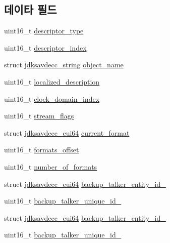 \subsection*{데이타 필드}
\begin{DoxyCompactItemize}
\item 
uint16\+\_\+t \hyperlink{structjdksavdecc__descriptor__stream_ab7c32b6c7131c13d4ea3b7ee2f09b78d}{descriptor\+\_\+type}
\item 
uint16\+\_\+t \hyperlink{structjdksavdecc__descriptor__stream_a042bbc76d835b82d27c1932431ee38d4}{descriptor\+\_\+index}
\item 
struct \hyperlink{structjdksavdecc__string}{jdksavdecc\+\_\+string} \hyperlink{structjdksavdecc__descriptor__stream_a7d1f5945a13863b1762fc6db74fa8f80}{object\+\_\+name}
\item 
uint16\+\_\+t \hyperlink{structjdksavdecc__descriptor__stream_a0926f846ca65a83ad5bb06b4aff8f408}{localized\+\_\+description}
\item 
uint16\+\_\+t \hyperlink{structjdksavdecc__descriptor__stream_a6608f023d147b556a49527d568abed8e}{clock\+\_\+domain\+\_\+index}
\item 
uint16\+\_\+t \hyperlink{structjdksavdecc__descriptor__stream_ae7a5037df4d2baee5b2d23e8c1add96e}{stream\+\_\+flags}
\item 
struct \hyperlink{structjdksavdecc__eui64}{jdksavdecc\+\_\+eui64} \hyperlink{structjdksavdecc__descriptor__stream_ae56fc78e7074485bad557163524904c7}{current\+\_\+format}
\item 
uint16\+\_\+t \hyperlink{structjdksavdecc__descriptor__stream_a14de2c30220ecf623bb08204c1c90e61}{formats\+\_\+offset}
\item 
uint16\+\_\+t \hyperlink{structjdksavdecc__descriptor__stream_a94e1bc90e2d9a472f293ef6a68702001}{number\+\_\+of\+\_\+formats}
\item 
struct \hyperlink{structjdksavdecc__eui64}{jdksavdecc\+\_\+eui64} \hyperlink{structjdksavdecc__descriptor__stream_a6d81901ba67de7a8dd9891bdec2d6bb0}{backup\+\_\+talker\+\_\+entity\+\_\+id\+\_}
\item 
uint16\+\_\+t \hyperlink{structjdksavdecc__descriptor__stream_ad46a052a08dd413492ed8c2e049217df}{backup\+\_\+talker\+\_\+unique\+\_\+id\+\_}
\item 
struct \hyperlink{structjdksavdecc__eui64}{jdksavdecc\+\_\+eui64} \hyperlink{structjdksavdecc__descriptor__stream_a5bfc8679d650a72f4441cc8e5327c59c}{backup\+\_\+talker\+\_\+entity\+\_\+id\+\_}
\item 
uint16\+\_\+t \hyperlink{structjdksavdecc__descriptor__stream_a06bead97e1d1c042d2a9da6c5efb5108}{backup\+\_\+talker\+\_\+unique\+\_\+id\+\_}

\end{DoxyCompactItemize}
